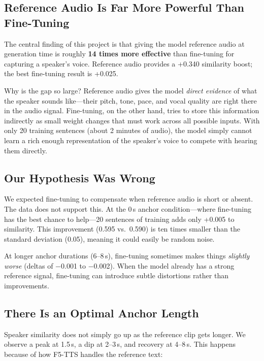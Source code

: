 \documentclass[11pt, a4paper]{article}
\begin{document}
\subsection{Reference Audio Is Far More Powerful Than Fine-Tuning}

The central finding of this project is that giving the model reference audio at generation time is roughly \textbf{14 times more effective} than fine-tuning for capturing a speaker's voice. Reference audio provides a +0.340 similarity boost; the best fine-tuning result is +0.025.

Why is the gap so large? Reference audio gives the model \emph{direct evidence} of what the speaker sounds like---their pitch, tone, pace, and vocal quality are right there in the audio signal. Fine-tuning, on the other hand, tries to store this information indirectly as small weight changes that must work across all possible inputs. With only 20 training sentences (about 2 minutes of audio), the model simply cannot learn a rich enough representation of the speaker's voice to compete with hearing them directly.

\subsection{Our Hypothesis Was Wrong}

We expected fine-tuning to compensate when reference audio is short or absent. The data does not support this. At the 0\,s anchor condition---where fine-tuning has the best chance to help---20 sentences of training adds only +0.005 to similarity. This improvement (0.595 vs.\ 0.590) is ten times smaller than the standard deviation (0.05), meaning it could easily be random noise.

At longer anchor durations (6--8\,s), fine-tuning sometimes makes things \emph{slightly worse} (deltas of $-$0.001 to $-$0.002). When the model already has a strong reference signal, fine-tuning can introduce subtle distortions rather than improvements.

\subsection{There Is an Optimal Anchor Length}

Speaker similarity does not simply go up as the reference clip gets longer. We observe a peak at 1.5\,s, a dip at 2--3\,s, and recovery at 4--8\,s. This happens because of how F5-TTS handles the reference text:
\end{document}
